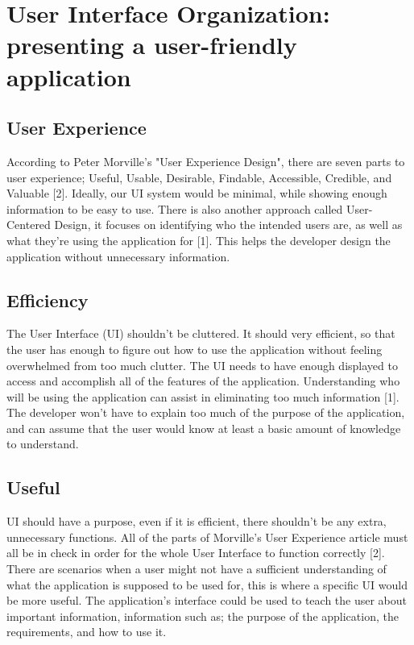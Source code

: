 \documentclass[a4paper, 11pt]{article} %
\begin{document}

\section{User Interface Organization: presenting a user-friendly application}
    \subsection{User Experience} According to Peter Morville's "User Experience Design", there are seven parts to user experience; Useful, Usable, Desirable, Findable, Accessible, Credible, and Valuable [2]. Ideally, our UI system would be minimal, while showing enough information to be easy to use. There is also another approach called User-Centered Design, it focuses on identifying who the intended users are, as well as what they're using the application for [1]. This helps the developer design the application without unnecessary information.
    \subsection{Efficiency} The User Interface (UI) shouldn't be cluttered. It should very efficient, so that the user has enough to figure out how to use the application without feeling overwhelmed from too much clutter. The UI needs to have enough displayed to access and accomplish all of the features of the application. Understanding who will be using the application can assist in eliminating too much information [1]. The developer won't have to explain too much of the purpose of the application, and can assume that the user would know at least a basic amount of knowledge to understand. 
    \subsection{Useful} UI should have a purpose, even if it is efficient, there shouldn't be any extra, unnecessary functions. All of the parts of Morville's User Experience article must all be in check in order for the whole User Interface to function correctly [2]. There are scenarios when a user might not have a sufficient understanding of what the application is supposed to be used for, this is where a specific UI would be more useful. The application's interface could be used to teach the user about important information, information such as; the purpose of the application, the requirements, and how to use it. 
\end{document}
